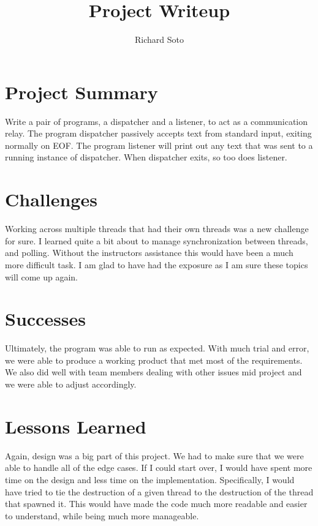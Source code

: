 \documentclass{article}
\title{Project Writeup}
\author{Richard Soto}
\begin{document}
  \maketitle

  \section{Project Summary}
  Write a pair of programs, a dispatcher and a listener, to act as a communication relay.
  The program dispatcher passively accepts text from standard input, exiting normally on EOF.
  The program listener will print out any text that was sent to a running instance of dispatcher. When dispatcher exits, so too does listener.

  \section{Challenges}
  Working across multiple threads that had their own threads was a new challenge for sure. I learned quite a bit about
  to manage synchronization between threads, and polling. Without the instructors assistance this would have been a much more difficult task.
  I am glad to have had the exposure as I am sure these topics will come up again.

  \section{Successes}
  Ultimately, the program was able to run as expected. With much trial and error, we were able to produce a working
  product that met most of the requirements. We also did well with team members dealing with other issues mid project
  and we were able to adjust accordingly.

  \section{Lessons Learned}
  Again, design was a big part of this project. We had to make sure that we were able to handle all of the edge cases.
  If I could start over, I would have spent more time on the design and less time on the implementation. Specifically,
  I would have tried to tie the destruction of a given thread to the destruction of the thread that spawned it. This would
  have made the code much more readable and easier to understand, while being much more manageable.
\end{document}
